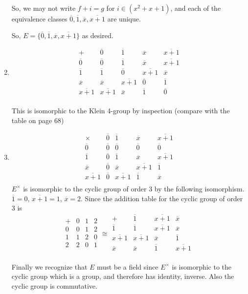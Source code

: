 \documentclass[12pt]{article}
\begin{document}
\begin{enumerate}
So, we may not write $f+i=g$ for $i \in (x^2+x+1)$, and each of the equivalence classes $\overline{0}, \overline{1}, \overline{x}, \overline{x+1}$ are unique.

So, $E = \{ \overline{0}, \overline{1}, \overline{x}, \overline{x+1} \}$ as desired.
\item 
\[
\begin{array}{ccccc}
+ & \overline{0} & \overline{1} & \overline{x} & \overline{x+1} \\
 \overline{0}& \overline{0} & \overline{1} & \overline{x} & \overline{x+1} \\
 \overline{1} & \overline{1} & \overline{0} & \overline{x+1} & \overline{x} \\
 \overline{x}& \overline{x} & \overline{x+1} & \overline{0} & \overline{1} \\
 \overline{x+1} &\overline{x+1} & \overline{x} & \overline{1} & \overline{0}\\
\end{array}
\]

This is isomorphic to the Klein 4-group by inspection (compare with the table on page 68)
\item
\[
\begin{array}{ccccc}
\times & \overline{0} & \overline{1} & \overline{x} & \overline{x+1} \\
 \overline{0}& \overline{0} & \overline{0} & \overline{0} & \overline{0} \\
 \overline{1} & \overline{0} & \overline{1} & \overline{x} & \overline{x+1} \\
 \overline{x}& \overline{0} & \overline{x} & \overline{x+1} & \overline{1} \\
 \overline{x+1} &\overline{0} & \overline{x+1} & \overline{1} & \overline{x}\\
\end{array}
\]
$E^{\times}$ is isomorphic to the cyclic group of order 3 by the following isomorphism. $\overline{1}= 0$, $\overline{x+1}=1$, $\overline{x}=2$. Since the addition table for the cyclic group of order 3 is 
\[
\begin{array}{cccc}
+ & 0 & 1 & 2\\
0 & 0 & 1 & 2\\
1 & 1 & 2 & 0\\
2 & 2 & 0 & 1\\
\end{array} 
\cong
\begin{array}{cccc}
+ & \overline{1} & \overline{x+1} & \overline{x}\\
\overline{1} & \overline{1} & \overline{x+1} & \overline{x}\\
\overline{x+1} & \overline{x+1} & \overline{x} & \overline{1}\\
\overline{x} & \overline{x} & \overline{1} & \overline{x+1}\\
\end{array} \
\]

Finally we recognize that $E$ must be a field since $E^\times$ is isomorphic to the cyclic group which is a group, and therefore has identity, inverse. Also the cyclic group is commutative.
\end{enumerate}
\end{document}

